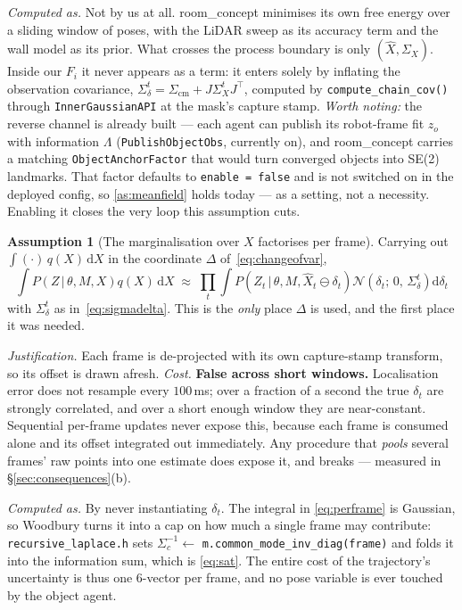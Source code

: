 \documentclass[11pt,a4paper]{report}
\newcommand{\given}{\,|\,}
\theoremstyle{definition}   %
\newtheorem{assumption}{Assumption}
\begin{document}
\smallskip\noindent\textit{Computed as.} Not by us at all. \textsf{room\_concept} minimises its own free energy over a sliding window of
poses, with the LiDAR sweep as its accuracy term and the wall model as its prior. What crosses the
process boundary is only $(\hat X,\Sigma_X)$. Inside our $F_i$ it never appears as a term: it
enters solely by inflating the observation covariance,
$\Sigma_\delta^t=\Sigma_{\mathrm{cm}}+J\Sigma_X^tJ^{\!\top}$, computed by
\texttt{compute\_chain\_cov()} through \texttt{InnerGaussianAPI} at the mask's capture stamp.
\emph{Worth noting:} the reverse channel is already built --- each agent can publish its
robot-frame fit $z_o$ with information $\Lambda$ (\texttt{PublishObjectObs}, currently on), and
\textsf{room\_concept} carries a matching \texttt{ObjectAnchorFactor} that would turn converged
objects into SE(2) landmarks. That factor defaults to \texttt{enable = false} and is not switched
on in the deployed config, so \ref{as:meanfield} holds today --- as a setting, not a necessity.
Enabling it closes the very loop this assumption cuts.

\begin{assumption}[The marginalisation over $X$ factorises per frame]\label{as:frames}
Carrying out $\int(\cdot)\,q(X)\,\mathrm{d}X$ in the coordinate $\Delta$ of~\eqref{eq:changeofvar},
\begin{equation}
\int P\!\left(Z\given\theta,M,X\right)q(X)\,\mathrm{d}X
\;\approx\;
\prod_t \int P\!\left(Z_t\given\theta,M,\hat X_t\ominus\delta_t\right)
\mathcal{N}\!\left(\delta_t;\,0,\,\Sigma_\delta^t\right)\mathrm{d}\delta_t
\label{eq:perframe}
\end{equation}
with $\Sigma_\delta^t$ as in~\eqref{eq:sigmadelta}. This is the \emph{only} place $\Delta$ is
used, and the first place it was needed.
\end{assumption}
\noindent\textit{Justification.} Each frame is de-projected with its own capture-stamp transform,
so its offset is drawn afresh. \textit{Cost.} \textbf{False across short windows.} Localisation
error does not resample every $100$\,ms; over a fraction of a second the true $\delta_t$ are
strongly correlated, and over a short enough window they are near-constant. Sequential per-frame
updates never expose this, because each frame is consumed alone and its offset integrated out
immediately. Any procedure that \emph{pools} several frames' raw points into one estimate does
expose it, and breaks --- measured in \S\ref{sec:consequences}(b).


\smallskip\noindent\textit{Computed as.} By never instantiating $\delta_t$. The integral in \eqref{eq:perframe} is Gaussian, so Woodbury
turns it into a cap on how much a single frame may contribute: \texttt{recursive\_laplace.h} sets
$\Sigma_c^{-1}\leftarrow$ \texttt{m.common\_mode\_inv\_diag(frame)} and folds it into the
information sum, which is \eqref{eq:sat}. The entire cost of the trajectory's uncertainty is thus
one $6$-vector per frame, and no pose variable is ever touched by the object agent.
\end{document}
